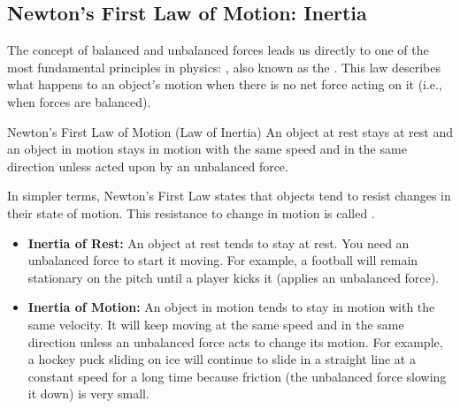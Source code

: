 \subsection{Newton's First Law of Motion: Inertia}

\begin{marginnote}
\end{marginnote}
The concept of balanced and unbalanced forces leads us directly to one of the most fundamental principles in physics: , also known as the .  This law describes what happens to an object's motion when there is no net force acting on it (i.e., when forces are balanced).

\begin{keyconcept}{Newton's First Law of Motion (Law of Inertia)}
An object at rest stays at rest and an object in motion stays in motion with the same speed and in the same direction unless acted upon by an unbalanced force.
\end{keyconcept}

In simpler terms, Newton's First Law states that objects tend to resist changes in their state of motion. This resistance to change in motion is called .

\begin{itemize}
    \item \textbf{Inertia of Rest:} An object at rest tends to stay at rest.  You need an unbalanced force to start it moving.  For example, a football will remain stationary on the pitch until a player kicks it (applies an unbalanced force).

    \item \textbf{Inertia of Motion:} An object in motion tends to stay in motion with the same velocity.  It will keep moving at the same speed and in the same direction unless an unbalanced force acts to change its motion.  For example, a hockey puck sliding on ice will continue to slide in a straight line at a constant speed for a long time because friction (the unbalanced force slowing it down) is very small.
\end{itemize}

